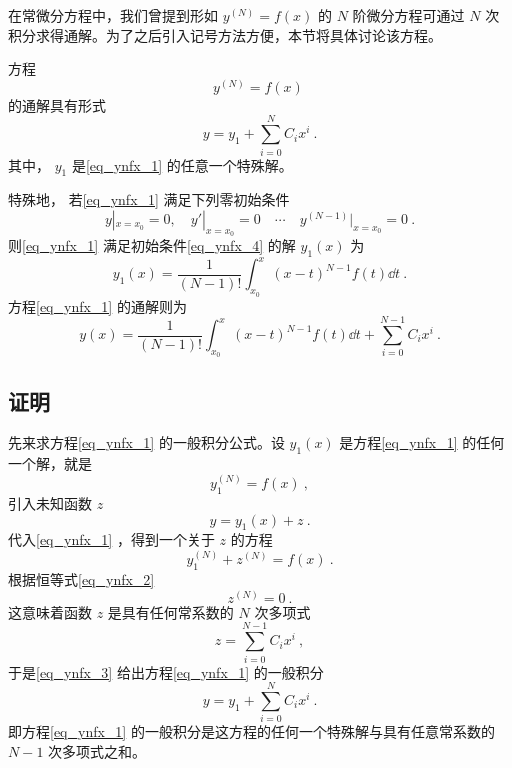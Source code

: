 
在常微分方程中，我们曾提到形如 $y^{(N)}=f(x)$ 的 $N$ 阶微分方程可通过 $N$ 次积分求得通解。为了之后引入记号方法方便，本节将具体讨论该方程。

方程
\begin{equation}\label{eq_ynfx_1}
y^{(N)}=f(x)~
\end{equation}
的通解具有形式
\begin{equation}\label{eq_ynfx_7}
y=y_1+\sum_{i=0}^{N}C_ix^i~.
\end{equation}
其中， $y_1$ 是\autoref{eq_ynfx_1} 的任意一个特殊解。

特殊地， 若\autoref{eq_ynfx_1} 满足下列零初始条件
\begin{equation}\label{eq_ynfx_4}
y|_{x=x_0}=0,\quad y'|_{x=x_0}=0\quad\cdots \quad y^{(N-1)}|_{x=x_0}=0~.
\end{equation}
则\autoref{eq_ynfx_1} 满足初始条件\autoref{eq_ynfx_4} 的解 $y_1(x)$ 为
\begin{equation}\label{eq_ynfx_5}
y_1(x)=\frac{1}{(N-1)!}\int_{x_0}^x(x-t)^{N-1}f(t)\dd t~.
\end{equation}
方程\autoref{eq_ynfx_1} 的通解则为
\begin{equation}
y(x)=\frac{1}{(N-1)!}\int_{x_0}^x(x-t)^{N-1}f(t)\dd t+\sum_{i=0}^{N-1}C_ix^i~.
\end{equation}
\subsection{证明}
先来求方程\autoref{eq_ynfx_1} 的一般积分公式。设 $y_1(x)$ 是方程\autoref{eq_ynfx_1} 的任何一个解，就是
\begin{equation}\label{eq_ynfx_2}
y_1^{(N)}=f(x)~,
\end{equation}
引入未知函数 $z$
\begin{equation}\label{eq_ynfx_3}
y=y_1(x)+z~.
\end{equation}
代入\autoref{eq_ynfx_1} ，得到一个关于 $z$ 的方程
\begin{equation}
y_1^{(N)}+z^{(N)}=f(x)~.
\end{equation}
根据恒等式\autoref{eq_ynfx_2} 
\begin{equation}
z^{(N)}=0~.
\end{equation}
这意味着函数 $z$ 是具有任何常系数的 $N$ 次多项式
\begin{equation}
z=\sum_{i=0}^{N-1}C_ix^i~,
\end{equation}
于是\autoref{eq_ynfx_3} 给出方程\autoref{eq_ynfx_1} 的一般积分
\begin{equation}
y=y_1+\sum_{i=0}^{N}C_ix^i~.
\end{equation}
即方程\autoref{eq_ynfx_1} 的一般积分是这方程的任何一个特殊解与具有任意常系数的 $N-1$ 次多项式之和。

